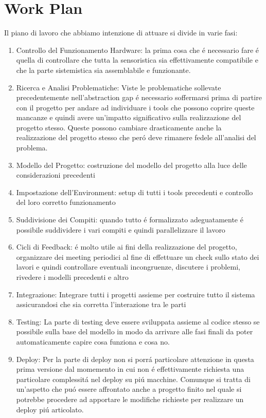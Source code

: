 \section{Work Plan}

Il piano di lavoro che abbiamo intenzione di attuare si divide in varie fasi:

\begin{enumerate}
  \item{Controllo del Funzionamento Hardware:} la prima cosa che \'e necessario fare \'e quella di controllare che tutta la sensoristica sia effettivamente compatibile e che la parte sistemistica sia assemblabile e funzionante.
  \item{Ricerca e Analisi Problematiche:} Viste le problematiche sollevate precedentemente nell'abstraction gap \'e necessario soffermarsi prima di partire con il progetto per andare ad individuare i tools che possono coprire queste mancanze e quindi avere un'impatto significativo sulla realizzazione del progetto stesso. Queste possono cambiare drasticamente anche la realizzazione del progetto stesso che per\'o deve rimanere fedele all'analisi del problema.
  \item{Modello del Progetto:} costruzione del modello del progetto alla luce delle considerazioni precedenti
  \item{Impostazione dell'Environment:} setup di tutti i tools precedenti e controllo del loro corretto funzionamento
  \item{Suddivisione dei Compiti:} quando tutto \'e formalizzato adeguatamente \'e possibile suddividere i vari compiti e quindi parallelizzare il lavoro
  \item{Cicli di Feedback:} \'e molto utile ai fini della realizzazione del progetto, organizzare dei meeting periodici al fine di effettuare un check sullo stato dei lavori e quindi controllare eventuali incongruenze, discutere i problemi, rivedere i modelli precedenti e altro
  \item{Integrazione:} Integrare tutti i progetti assieme per costruire tutto il sistema assicurandosi che sia corretta l'interazione tra le parti
  \item{Testing:} La parte di testing deve essere sviluppata assieme al codice stesso se possibile sulla base del modello in modo da arrivare alle fasi finali da poter automaticamente capire cosa funziona e cosa no.
  \item{Deploy:} Per la parte di deploy non si porr\'a particolare attenzione in questa prima versione dal momemento in cui non \'e effettivamente richiesta una particolare complessit\'a nel deploy su pi\'u macchine. Comunque si tratta di un'aspetto che pu\'o essere affrontato anche a progetto finito nel quale si potrebbe procedere ad apportare le modifiche richieste per realizzare un deploy pi\'u articolato.
\end{enumerate}

